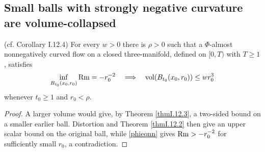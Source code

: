 \subsection{Small balls with strongly negative curvature are volume-collapsed}
\label{I.12.4}
\begin{corollary}
\label{cor:kl-small-balls-strongly-negative-curvature-volume-collapsed-positivity-curvature}

(cf. Corollary I.12.4) \label{corI.12.4}
For every $w>0$ there is $\rho>0$ such that a $\Phi$-almost nonnegatively
curved flow on a closed three-manifold, defined on $[0,T)$ with $T\geq1$,
satisfies
\[
\inf_{B_{t_0}(x_0,r_0)}\operatorname{Rm}=-r_0^{-2}
\quad\Longrightarrow\quad
\operatorname{vol}(B_{t_0}(x_0,r_0))\leq wr_0^3
\]
whenever $t_0\geq1$ and $r_0<\rho$.
\end{corollary}
\begin{proof}
\sketch A larger volume would give, by Theorem \ref{thmI.12.3}, a
two-sided bound on a smaller earlier ball.  Distortion and Theorem
\ref{thmI.12.2} then give an upper scalar bound on the original ball, while
\eqref{phieqnn} gives $\operatorname{Rm}> -r_0^{-2}$ for sufficiently small $r_0$, a
contradiction.
\end{proof}

